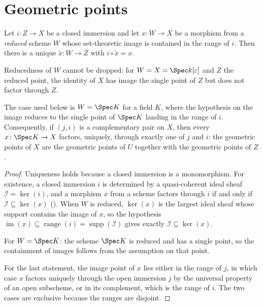 \section{Geometric points}\label{sec:openclosed-points}

\begin{lemma}
\label{lemma:openclosed-point-factors}
\leanok
Let $i\colon Z\to X$ be a closed immersion and let $x\colon W\to X$ be a
morphism from a \emph{reduced} scheme $W$ whose set-theoretic image is
contained in the range of $i$.  Then there is a unique
$\tilde x\colon W\to Z$ with $i\circ\tilde x=x$.

Reducedness of $W$ cannot be dropped: for $W=X=\Spec k[\varepsilon]$ and $Z$
the reduced point, the identity of $X$ has image the single point of $Z$ but
does not factor through $Z$.

The case used below is $W=\Spec K$ for a field $K$, where the hypothesis on
the image reduces to the single point of $\Spec K$ landing in the range of
$i$.  Consequently, if $(j,i)$ is a complementary pair on $X$, then every
$x\colon\Spec K\to X$ factors, uniquely, through exactly one of $j$ and $i$:
the geometric points of $X$ are the geometric points of $U$ together with the
geometric points of $Z$.
\end{lemma}
\begin{proof}
\leanok
Uniqueness holds because a closed immersion is a monomorphism.  For existence,
a closed immersion $i$ is determined by a quasi-coherent ideal sheaf
$\mathcal I=\ker(i)$, and a morphism $x$ from a scheme factors through $i$ if
and only if $\mathcal I\subseteq\ker(x)$
().  When $W$ is reduced, $\ker(x)$ is
the largest ideal sheaf whose support contains the image of $x$, so the
hypothesis
$\operatorname{im}(x)\subseteq\operatorname{range}(i)=
\operatorname{supp}(\mathcal I)$
gives exactly $\mathcal I\subseteq\ker(x)$.

For $W=\Spec K$: the scheme $\Spec K$ is reduced and has a single point, so
the containment of images follows from the assumption on that point.

For the last statement, the image point of $x$ lies either in the range of
$j$, in which case $x$ factors uniquely through the open immersion $j$ by the
universal property of an open subscheme, or in its complement, which is the
range of $i$.  The two cases are exclusive because the ranges are disjoint.
\end{proof}


